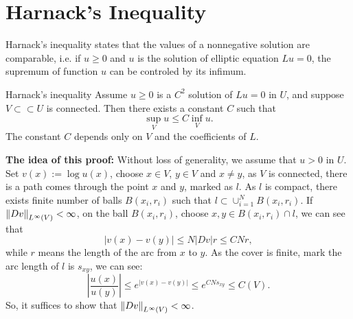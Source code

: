 \section{Harnack's Inequality}
Harnack's inequality states that the values of a nonnegative solution are comparable, i.e. if $u\ge 0$ and $u$ is the solution of elliptic equation $Lu=0$, the supremum of function $u$ can be controled by its infimum.
\begin{theorem}{Harnack's inequality}
    Assume $u\ge 0$ is a $C^{2}$ solution of $Lu=0$ in $U$, and suppose $V\subset\subset U$ is connected. Then there exists a constant $C$ such that 
    \begin{equation}
        \sup_{V}u\le C\inf_{V}u.
    \end{equation}
    The constant $C$ depends only on $V$ and the coefficients of $L$.
\end{theorem}
\textbf{The idea of this proof:} Without loss of generality, we assume that $u>0$ in $U$. Set $v(x):=\log u(x)$, choose $x\in V$, $y\in V$ and $x\neq y$, as $V$ is connected, there is a path comes through the point $x$ and $y$, marked as $l$. As $l$ is compact, there exists finite number of balls $B(x_{i},r_{i})$ such that $l\subset\cup_{i=1}^{N}B(x_{i},r_{i})$. If $\left\|Dv\right\|_{L^{\infty}(V)}<\infty$, on the ball $B(x_{i},r_{i})$, choose $x,y\in B(x_{i},r_{i})\cap l$, we can see that 
\begin{equation}
    |v(x)-v(y)|\le N|Dv|r\le CNr,
\end{equation}
while $r$ means the length of the arc from $x$ to $y$. As the cover is finite, mark the arc length of $l$ is $s_{xy}$, we can see:
\begin{equation}
    \left|\frac{u(x)}{u(y)}\right|\le e^{|v(x)-v(y)|}\le e^{CNs_{xy}}\le C(V).
\end{equation}
So, it suffices to show that $\left\|Dv\right\|_{L^{\infty}(V)}<\infty$.
